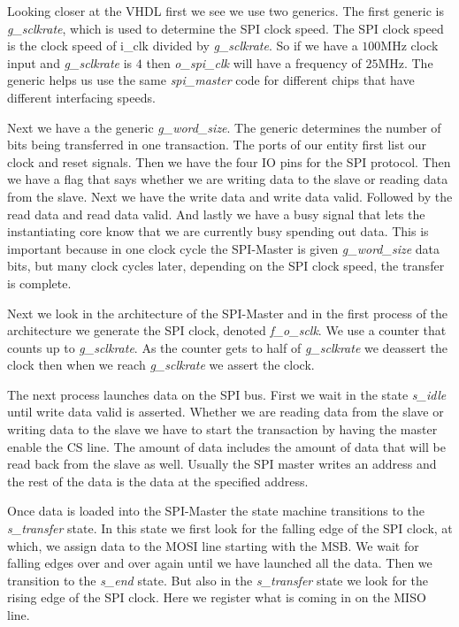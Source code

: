 Looking closer at the \ac{VHDL} first we see we use two generics. The first generic is \emph{g\_sclkrate}, which is used to determine the \ac{SPI} clock speed. The \ac{SPI} clock speed is the clock speed of i\_clk divided by \emph{g\_sclkrate}. So if we have a $100$\ac{MHz} clock input and \emph{g\_sclkrate} is $4$ then \emph{o\_spi\_clk} will have a frequency of $25$\ac{MHz}. The generic helps us use the same \emph{spi\_master} code for different chips that have different interfacing speeds. 

Next we have a the generic \emph{g\_word\_size}. The generic determines the number of bits being transferred in one transaction. The ports of our entity first list our clock and reset signals. Then we have the four \ac{IO} pins for the \ac{SPI} protocol. Then we have a flag that says whether we are writing data to the slave or reading data from the slave. Next we have the write data and write data valid. Followed by the read data and read data valid. And lastly we have a busy signal that lets the instantiating core know that we are currently busy spending out data. This is important because in one clock cycle the \ac{SPI}-Master is given \emph{g\_word\_size} data bits, but many clock cycles later, depending on the \ac{SPI} clock speed, the transfer is complete. 

Next we look in the architecture of the \ac{SPI}-Master and in the first process of the architecture we generate the \ac{SPI} clock, denoted \emph{f\_o\_sclk}. We use a counter that counts up to \emph{g\_sclkrate}. As the counter gets to half of \emph{g\_sclkrate} we deassert the clock then when we reach \emph{g\_sclkrate} we assert the clock. 

The next process launches data on the \ac{SPI} bus. First we wait in the state \emph{s\_idle} until write data valid is asserted. Whether we are reading data from the slave or writing data to the slave we have to start the transaction by having the master enable the \ac{CS} line. The amount of data includes the amount of data that will be read back from the slave as well. Usually the \ac{SPI} master writes an address and the rest of the data is the data at the specified address.

Once data is loaded into the \ac{SPI}-Master the state machine transitions to the \emph{s\_transfer} state. In this state we first look for the falling edge of the \ac{SPI} clock, at which, we assign data to the \ac{MOSI} line starting with the \ac{MSB}. We wait for falling edges over and over again until we have launched all the data. Then we transition to the \emph{s\_end} state. But also in the \emph{s\_transfer} state we look for the rising edge of the \ac{SPI} clock. Here we register what is coming in on the \ac{MISO} line. 

